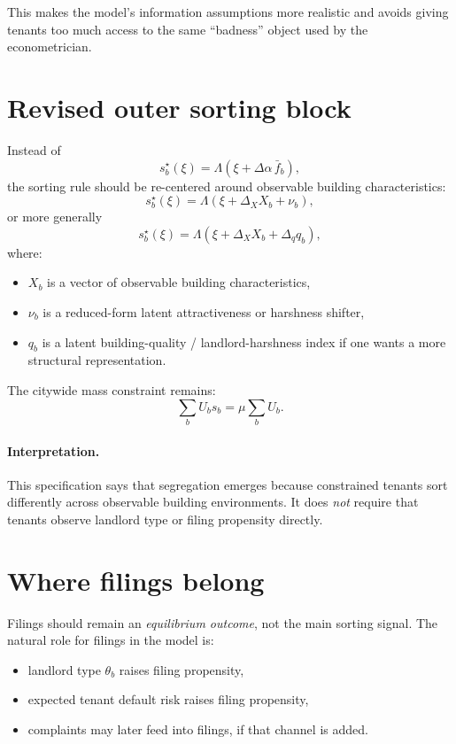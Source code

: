 \documentclass[11pt]{article}
\begin{document}
This makes the model's information assumptions more realistic and avoids giving tenants too much access to the same ``badness'' object used by the econometrician.

\section{Revised outer sorting block}
Instead of
\[
s_b^\star(\xi)=\Lambda\!\left(\xi + \Delta\alpha\,\bar f_b\right),
\]
the sorting rule should be re-centered around observable building characteristics:
\[
s_b^\star(\xi)=\Lambda\!\left(\xi + \Delta_X X_b + \nu_b\right),
\]
or more generally
\[
s_b^\star(\xi)=\Lambda\!\left(\xi + \Delta_X X_b + \Delta_q q_b\right),
\]
where:
\begin{itemize}
    \item $X_b$ is a vector of observable building characteristics,
    \item $\nu_b$ is a reduced-form latent attractiveness or harshness shifter,
    \item $q_b$ is a latent building-quality / landlord-harshness index if one wants a more structural representation.
\end{itemize}

The citywide mass constraint remains:
\[
\sum_b U_b s_b = \mu \sum_b U_b.
\]

\paragraph{Interpretation.}
This specification says that segregation emerges because constrained tenants sort differently across observable building environments. It does \emph{not} require that tenants observe landlord type or filing propensity directly.

\section{Where filings belong}
Filings should remain an \emph{equilibrium outcome}, not the main sorting signal. The natural role for filings in the model is:
\begin{itemize}
    \item landlord type $\theta_b$ raises filing propensity,
    \item expected tenant default risk raises filing propensity,
    \item complaints may later feed into filings, if that channel is added.
\end{itemize}
\end{document}
